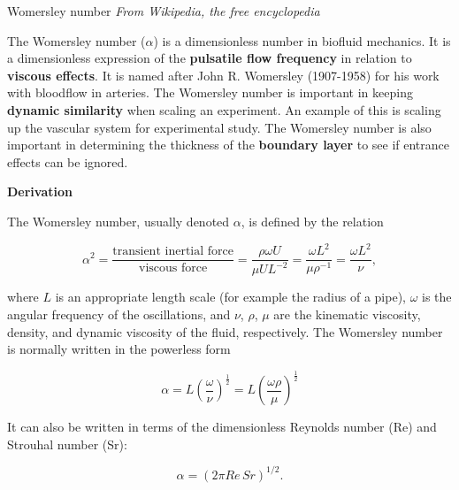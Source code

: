 \documentclass{beamer}
\begin{document}
\begin{frame}{Womersley number}
\tiny
\textit{From Wikipedia, the free encyclopedia}

\medskip

The Womersley number ($\alpha$) is a dimensionless number in biofluid mechanics. It is a dimensionless expression of the \textbf{pulsatile flow frequency} in relation to \textbf{viscous effects}. It is named after John R. Womersley (1907-1958) for his work with bloodflow in arteries. The Womersley number is important in keeping \textbf{dynamic similarity} when scaling an experiment. An example of this is scaling up the vascular system for experimental study. The Womersley number is also important in determining the thickness of the \textbf{boundary layer} to see if entrance effects can be ignored.

\medskip

\textbf{Derivation} 

\medskip

The Womersley number, usually denoted $\alpha$, is defined by the relation

\begin{equation*}
\alpha^2 = \frac{\text{transient inertial force}}{\text{viscous force}} = \frac{\rho \omega U}{\mu U L^{-2}} = \frac{\omega L^2}{\mu \rho^{-1}} = \frac{\omega L^2}{\nu},
\end{equation*}

where \(L\) is an appropriate length scale (for example the radius of a pipe), \(\omega\) is the angular frequency of the oscillations, and \(\nu\), \(\rho\), \(\mu\) are the kinematic viscosity, density, and dynamic viscosity of the fluid, respectively. The Womersley number is normally written in the powerless form

\begin{equation*}
\alpha = L \left( \frac{\omega}{\nu} \right)^{\frac{1}{2}} = L \left( \frac{\omega \rho}{\mu} \right)^{\frac{1}{2}}
\end{equation*}

It can also be written in terms of the dimensionless Reynolds number (Re) and Strouhal number (Sr):

\begin{equation*}
\alpha = (2 \pi Re \, Sr)^{1/2}.
\end{equation*}

\end{frame}
\end{document}

